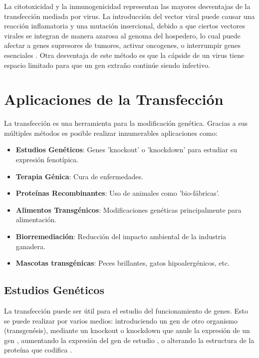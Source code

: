 \documentclass[fleqn,10pt]{SelfArx} %
\begin{document}
La citotoxicidad y la inmunogenicidad representan las mayores desventajas de la transfección mediada por virus. La introducción del vector viral puede causar una reacción inflamatoria y una mutación insercional, debido a que ciertos vectores virales se integran de manera azarosa al genoma del hospedero, lo cual puede afectar a genes supresores de tumores, activar oncogenes, o interrumpir genes esenciales \cite{Woods:2003aa}. Otra desventaja de este método es que la cápside de un virus tiene espacio limitado para que un gen extraño continúe siendo infectivo. 

\section{Aplicaciones de la Transfección}

La transfección es una herramienta para la modificación genética. Gracias a sus múltiples métodos es posible realizar innumerables aplicaciones como:
\begin{itemize}[noitemsep] %
\item \textbf{Estudios Genéticos}: Genes 'knockout' o 'knockdown' para estudiar su expresión fenotípica.
\item \textbf{Terapia Génica}: Cura de enfermedades.
\item \textbf{Proteínas Recombinantes}: Uso de animales como 'bio-fábricas'.
\item \textbf{Alimentos Transgénicos}: Modificaciones genéticas principalmente para alimentación.
\item \textbf{Biorremediación}: Reducción del impacto ambiental de la industria ganadera.
\item \textbf{Mascotas transgénicas}: Peces brillantes, gatos hipoalergénicos, etc.
\end{itemize}

\subsection{Estudios Genéticos}

La transfección puede ser útil para el estudio del funcionamiento de genes. Esto se puede realizar por varios medios: introduciendo un gen de otro organismo (transgenésis), mediante un knockout o knockdown que anule la expresión de un gen \cite{cryanin2004}, aumentando la expresión del gen de estudio \cite{yanni2004laboratory}, o alterando la estructura de la proteína que codifica \cite{ripps1995transgenic}.
\end{document}
